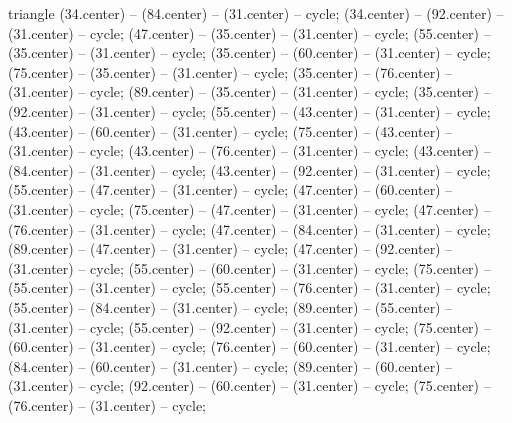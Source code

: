 \begin{pgfonlayer}{triangle}
 (34.center) -- (84.center) -- (31.center) -- cycle; 
 (34.center) -- (92.center) -- (31.center) -- cycle; 
 (47.center) -- (35.center) -- (31.center) -- cycle; 
 (55.center) -- (35.center) -- (31.center) -- cycle; 
 (35.center) -- (60.center) -- (31.center) -- cycle; 
 (75.center) -- (35.center) -- (31.center) -- cycle; 
 (35.center) -- (76.center) -- (31.center) -- cycle; 
 (89.center) -- (35.center) -- (31.center) -- cycle; 
 (35.center) -- (92.center) -- (31.center) -- cycle; 
 (55.center) -- (43.center) -- (31.center) -- cycle; 
 (43.center) -- (60.center) -- (31.center) -- cycle; 
 (75.center) -- (43.center) -- (31.center) -- cycle; 
 (43.center) -- (76.center) -- (31.center) -- cycle; 
 (43.center) -- (84.center) -- (31.center) -- cycle; 
 (43.center) -- (92.center) -- (31.center) -- cycle; 
 (55.center) -- (47.center) -- (31.center) -- cycle; 
 (47.center) -- (60.center) -- (31.center) -- cycle; 
 (75.center) -- (47.center) -- (31.center) -- cycle; 
 (47.center) -- (76.center) -- (31.center) -- cycle; 
 (47.center) -- (84.center) -- (31.center) -- cycle; 
 (89.center) -- (47.center) -- (31.center) -- cycle; 
 (47.center) -- (92.center) -- (31.center) -- cycle; 
 (55.center) -- (60.center) -- (31.center) -- cycle; 
 (75.center) -- (55.center) -- (31.center) -- cycle; 
 (55.center) -- (76.center) -- (31.center) -- cycle; 
 (55.center) -- (84.center) -- (31.center) -- cycle; 
 (89.center) -- (55.center) -- (31.center) -- cycle; 
 (55.center) -- (92.center) -- (31.center) -- cycle; 
 (75.center) -- (60.center) -- (31.center) -- cycle; 
 (76.center) -- (60.center) -- (31.center) -- cycle; 
 (84.center) -- (60.center) -- (31.center) -- cycle; 
 (89.center) -- (60.center) -- (31.center) -- cycle; 
 (92.center) -- (60.center) -- (31.center) -- cycle; 
 (75.center) -- (76.center) -- (31.center) -- cycle; 

\end{pgfonlayer}
